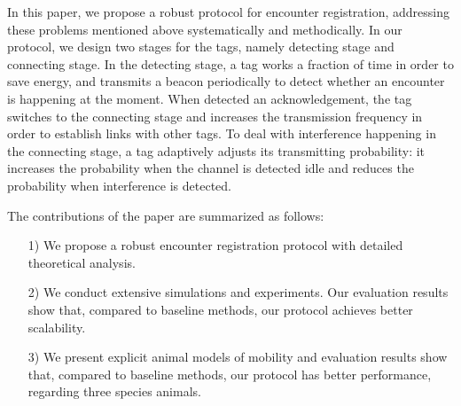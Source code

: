 

In this paper, we propose a robust protocol for encounter registration, 
addressing these problems mentioned above systematically and
methodically. In our protocol, we design two stages for the tags, 
namely detecting stage and connecting stage.
In the detecting stage, a tag works a fraction of time in order to save energy,
and transmits a beacon periodically to detect whether an encounter is happening at the moment.
When detected an acknowledgement, the tag switches to the connecting stage and increases the 
transmission frequency in order to establish links with other tags. To deal with interference 
happening in the connecting stage,
a tag adaptively adjusts its transmitting probability: it increases the probability when 
the channel is detected idle and reduces the probability when interference is detected.  


The contributions of the paper are summarized as follows:
\begin{itemize}
\item[1)] We propose a robust encounter registration protocol  
with detailed theoretical analysis. 
\item[2)] We conduct extensive simulations and experiments. Our evaluation results show that, 
compared to baseline methods, our protocol achieves better scalability.
\item[3)] We present explicit animal models of mobility and evaluation results show that,
compared to baseline methods, our protocol has better performance, regarding three species animals. 
\end{itemize}

